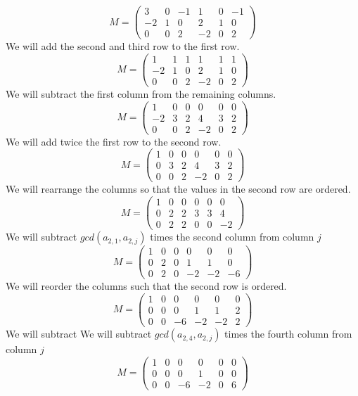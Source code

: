 \documentclass[11pt]{article}
\theoremstyle{plain}
\theoremstyle{definition}
\begin{document}
\[ M = \left( \begin{array}{cccccc}
 3 &0&-1&1&0&-1 \\
 -2&1&0&2&1&0\\
 0&0&2&-2&0&2  
\end{array}\right) \]
We will add the second and third row to the first row.
\[ M = \left( \begin{array}{cccccc}
1 &1&1&1&1&1 \\
-2&1&0&2&1&0\\
0&0&2&-2&0&2  
\end{array}\right) \]
We will subtract the first column from the remaining columns.
\[ M = \left( \begin{array}{cccccc}
1 &0&0&0&0&0 \\
-2&3&2&4&3&2\\
0&0&2&-2&0&2  
\end{array}\right) \]
We will add twice the first row to the second row.
\[ M = \left( \begin{array}{cccccc}
1 &0&0&0&0&0 \\
0&3&2&4&3&2\\
0&0&2&-2&0&2  
\end{array}\right) \]
We will rearrange the columns so that the values in the second row are ordered.
\[ M = \left( \begin{array}{cccccc}
1 &0&0&0&0&0 \\
0&2&2&3&3&4\\
0&2&2&0&0&-2  
\end{array}\right) \]
We will subtract $gcd(a_{2,1},a_{2,j})$ times the second column from column $j$
\[ M = \left( \begin{array}{cccccc}
1 &0&0&0&0&0 \\
0&2&0&1&1&0\\
0&2&0&-2&-2&-6  
\end{array}\right) \]
We will reorder the columns such that the second row is ordered.
\[ M = \left( \begin{array}{cccccc}
1 &0&0&0&0&0 \\
0&0&0&1&1&2\\
0&0&-6&-2&-2&2  
\end{array}\right) \]
We will subtract We will subtract $gcd(a_{2,4},a_{2,j})$ times the fourth column from column $j$
\[ M = \left( \begin{array}{cccccc}
1 &0&0&0&0&0 \\
0&0&0&1&0&0\\
0&0&-6&-2&0&6  
\end{array}\right) \]
\end{document}
